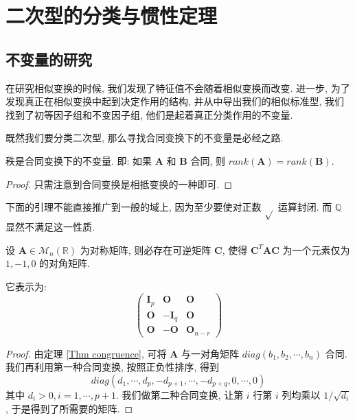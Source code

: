 \documentclass[UTF8]{book}
\begin{document}
\section{二次型的分类与惯性定理}


\subsection{不变量的研究}

在研究相似变换的时候, 我们发现了特征值不会随着相似变换而改变. 
进一步, 为了发现真正在相似变换中起到决定作用的结构, 并从中导出我们的相似标准型, 
我们找到了初等因子组和不变因子组, 
他们是起着真正分类作用的不变量. 

既然我们要分类二次型, 那么寻找合同变换下的不变量是必经之路. 

\begin{proposition} \label{prop rank of congruence}
    秩是合同变换下的不变量. 
    即: 如果 $\boldsymbol{A}$ 和 $\boldsymbol{B}$ 合同, 
    则 $ rank(\boldsymbol{A}) = rank(\boldsymbol{B}) $.
\end{proposition}

\begin{proof}
    只需注意到合同变换是相抵变换的一种即可. 
\end{proof}

下面的引理不能直接推广到一般的域上, 
因为至少要使对正数 $ \sqrt{} $ 运算封闭. 而 $\mathbb{Q}$ 显然不满足这一性质. 

\begin{lemma} \label{lemma congruence normal form}
    设 $\boldsymbol{A}\in \mathcal{M}_n(\mathbb{R})$ 为对称矩阵, 
    则必存在可逆矩阵 $\boldsymbol{C}$, 使得 
    $\boldsymbol{C}^T\boldsymbol{A}\boldsymbol{C}$ 
    为一个元素仅为 $1,-1,0$ 的对角矩阵. 
    
    它表示为: 
    $$
    \begin{pmatrix}
        \boldsymbol{I}_p & \boldsymbol{O} & \boldsymbol{O} \\
        \boldsymbol{O} &-\boldsymbol{I}_q & \boldsymbol{O} \\
        \boldsymbol{O} &-\boldsymbol{O} & \boldsymbol{O}_{n-r} 
    \end{pmatrix}
    $$
\end{lemma}

\begin{proof}
    由定理 \ref{Thm congruence}, 可将 $\boldsymbol{A}$ 
    与一对角矩阵 $diag(b_1,b_2,\cdots,b_n)$ 合同. 
    我们再利用第一种合同变换, 按照正负性排序, 得到
    $$ diag(d_1,\cdots,d_p,-d_{p+1},\cdots,-d_{p+q},0,\cdots,0) $$ 
    其中 $d_i >0, i=1,\cdots,p+1$. 
    我们做第二种合同变换, 让第 $i$ 行第 $i$ 列均乘以 $1/\sqrt{d_i}$, 
    于是得到了所需要的矩阵. 
\end{proof}
\end{document}
